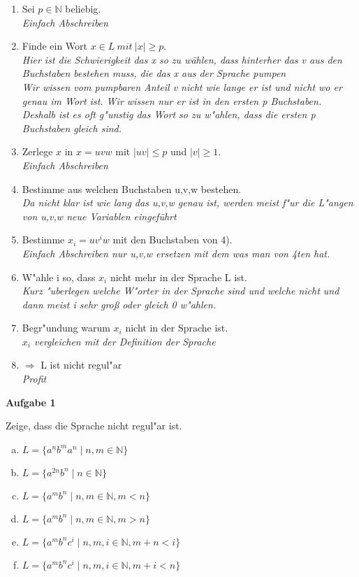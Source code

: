 \documentclass[a4paper,12pt]{article}
\newcommand{\Aufgabe}[1]{
  {
  \vspace*{0.5cm}
  \textsf{\textbf{Aufgabe #1}}
  \vspace*{0.2cm}
  
  }
}
\begin{document}
\begin{enumerate}[1)]
\item Sei $p \in \mathbb{N}$ beliebig. \\ \textit{Einfach Abschreiben }
\item Finde ein Wort $x \in L \ mit \ \vert x\vert \geq p$. \\ \textit{Hier ist die Schwierigkeit das x so zu wählen, dass hinterher das v aus den Buchstaben bestehen muss, die das x aus der Sprache pumpen
\\  Wir wissen vom pumpbaren Anteil v nicht wie lange er ist und nicht wo er genau im Wort ist. Wir wissen nur er ist in den ersten p Buchstaben. Deshalb ist es oft g"unstig das Wort so zu w"ahlen, dass die ersten p Buchstaben gleich sind.}
\item Zerlege $x$ in $x=uvw$ mit $\vert uv\vert \leq p$ und $\vert v \vert \geq 1$.
\\ \textit{Einfach Abschreiben }
\item Bestimme aus welchen Buchstaben u,v,w bestehen.
\\ \textit{Da nicht klar ist wie lang das u,v,w genau ist, werden meist f"ur die L"angen von u,v,w neue Variablen eingeführt }
\item Bestimme $x_i = uv^iw$ mit den Buchstaben von 4).
\\ \textit{Einfach Abschreiben nur u,v,w ersetzen mit dem was man von 4ten hat. }
\item W"ahle i so, dass $x_i$ nicht mehr in der Sprache L ist.
\\ \textit{Kurz "uberlegen welche W"orter in der Sprache sind und welche nicht und dann meist i sehr groß oder gleich 0 w"ahlen. }
\item Begr"undung warum $x_i$ nicht in der Sprache ist.
\\ \textit{$x_i$ vergleichen mit der Definition der Sprache}
\item $\Rightarrow$ L ist nicht regul"ar
\\ \textit{Profit}

\end{enumerate}
\Aufgabe{1}
Zeige, dass die Sprache nicht regul"ar ist.
\begin{enumerate}[a)]
\item $L = \{a^nb^ma^n  \mid n,m \in \mathbb{N}\} $
\item $L = \{a^{2n}b^n \mid n \in \mathbb{N}\} $
\item $L = \{a^mb^n\mid n,m \in \mathbb{N}, m<n\} $
\item $L = \{a^mb^n\mid n,m \in \mathbb{N}, m> n\} $
\item $L = \{a^mb^nc^i \mid n,m,i \in \mathbb{N}, m+n<i \} $
\item $L = \{a^mb^nc^i \mid n,m,i \in \mathbb{N}, m+i<n \} $
\end{enumerate}
\end{document}
